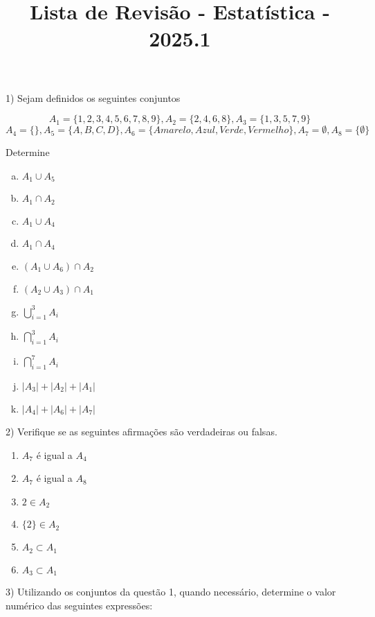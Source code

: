 \documentclass{article}
\title{Lista de Revisão - Estatística - 2025.1}
\begin{document}
\date{}
\maketitle

1) Sejam definidos os seguintes conjuntos

$$A_1 = \{1,2,3,4,5,6,7,8,9\}, A_2 = \{2, 4, 6, 8\}, A_3 = \{1, 3, 5, 7, 9\}$$
$$A_4 = \{\}, A_5 = \{A, B, C, D\}, A_6 = \{Amarelo, Azul, Verde, Vermelho\}, A_7 = \emptyset, A_8 = \{\emptyset\}$$

Determine

\begin{enumerate}[a)] %
    \item $A_1 \cup A_5$
    \item $A_1 \cap A_2$
    \item $A_1 \cup A_4$
    \item $A_1 \cap A_4$
    \item $(A_1 \cup A_6) \cap A_2$
    \item $(A_2 \cup A_3) \cap A_1$
    \item $\bigcup\limits_{i=1}^{3} A_i$
    \item $\bigcap\limits_{i=1}^{3} A_i$
    \item $\bigcap\limits_{i=1}^{7} A_i$
    \item $|A_3| + |A_2| + |A_1|$
    \item $|A_4| + |A_6| + |A_7|$
\end{enumerate}
\vspace{10px}

2) Verifique se as seguintes afirmações são verdadeiras ou falsas. 

\begin{enumerate}
    \item $A_7$ é igual a $A_4$
    \item $A_7$ é igual a $A_8$
    \item $2 \in A_2$
    \item $\{2\} \in A_2$
    \item $A_2 \subset A_1$
    \item $A_3 \subset A_1$
\end{enumerate}

3) Utilizando os conjuntos da questão 1, quando necessário, determine o valor numérico das seguintes expressões:
\end{document}
